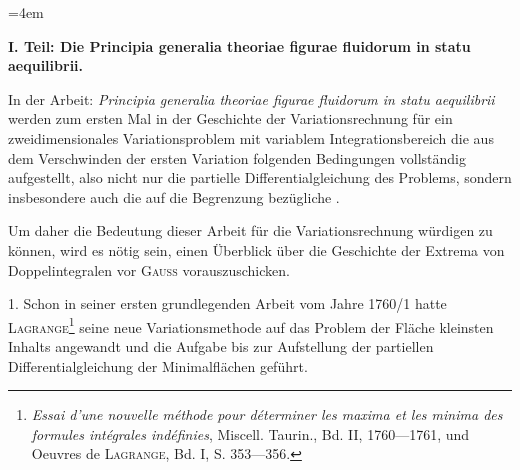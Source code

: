 \clearpage\begingroup
\emergencystretch=4em\relax\NoSourceHead{}
\makeatletter\tagsleft@true\let\veqno\@@leqno\makeatother
\renewcommand{\thefootnote}{\arabic{footnote})}\setcounter{footnote}{0}
\begin{center}\bfseries
I. Teil: Die Principia generalia theoriae figurae fluidorum in statu aequilibrii.
\end{center}
\noindent\hspace*{\parindent}In der Arbeit: \textit{Principia generalia theoriae figurae fluidorum in statu aequilibrii}
werden zum ersten Mal in der Geschichte der Variationsrechnung für
ein zweidimensionales Variationsproblem mit variablem Integrationsbereich die
aus dem Verschwinden der ersten Variation folgenden Bedingungen vollständig
aufgestellt, also nicht nur die partielle Differentialgleichung des Problems,
sondern insbesondere auch die auf die Begrenzung bezügliche .

Um daher die Bedeutung dieser Arbeit für die Variationsrechnung würdigen
zu können, wird es nötig sein, einen Überblick über die Geschichte der Extrema
von Doppelintegralen vor \textsc{Gauss} vorauszuschicken.

\begin{center}\par
{}\end{center}
\noindent\hspace*{\parindent}1. Schon in seiner ersten grundlegenden Arbeit vom Jahre 1760/1 hatte
\textsc{Lagrange}\footnote{\textit{Essai d'une nouvelle méthode pour déterminer les maxima et les minima des formules intégrales indéfinies}, Miscell. Taurin., Bd. II, 1760—1761, und Oeuvres de \textsc{Lagrange}, Bd. I, S. 353—356.}
seine neue Variationsmethode auf das Problem der Fläche kleinsten
Inhalts\linebreak {} angewandt und die Aufgabe bis zur
Aufstellung der partiellen Differentialgleichung der Minimalflächen geführt.

